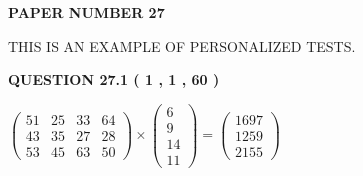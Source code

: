 \documentclass[12pt]{article}
\begin{document}
   
   
   
\newpage 
\setcounter{page}{ 
    27001 } 
   
   
   
   
 {\textbf{ \Large{ PAPER NUMBER  27  }}}
   
   
\vspace{0.2in}
   
   
   
   
   
   
 \vspace{0.2in}
{\Huge  THIS IS AN EXAMPLE OF}
{\Huge  PERSONALIZED TESTS. }
   
   
  
\vspace{0.2in}
  
{\textbf{\Large{QUESTION
27.1 
 ( 1 , 1 , 60 )
}}}
  
  
 
 
\noindent{}

 
$\left( \begin{array}{ccccccccccccccc}
 51  & 
 25  & 
 33  & 
 64  \\ 
 43  & 
 35  & 
 27  & 
 28  \\ 
 53  & 
 45  & 
 63  & 
 50
\end{array}\right) \times
\left( \begin{array}{c}
 6  \\ 
 9  \\ 
 14  \\ 
 11
\end{array}\right)  =
\left( \begin{array}{c}
 1697  \\ 
 1259  \\ 
 2155
\end{array}\right)  $
 
\end{document}
